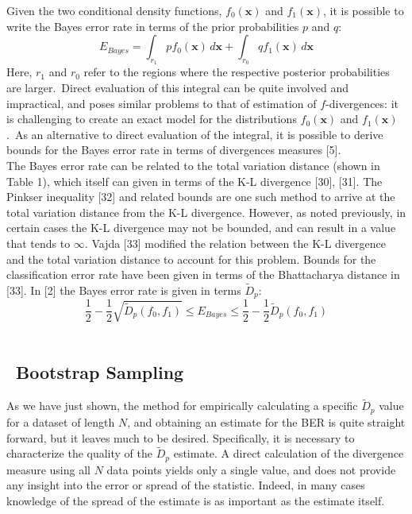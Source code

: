 \documentclass{article}
\begin{document}
	\indent Given the two conditional density functions, $f_0(\textbf{x})$ and $f_1(\textbf{x})$, it is possible to write the Bayes error rate in terms of the prior probabilities $p$ and $q$:
	\begin{equation} E_{Bayes}=\int_{r_1} pf_0(\textbf{x}) \,d\textbf{x} + \int_{r_0} qf_1(\textbf{x}) \,d\textbf{x} \end{equation}
	\indent Here, $r_1$ and $r_0$ refer to the regions where the respective posterior probabilities are larger.\ Direct evaluation of this integral can be quite involved and impractical, and poses similar problems to that of estimation of $f$-divergences: it is challenging to create an exact model for the distributions $f_0(\textbf{x})$ and $f_1(\textbf{x})$.\ As an alternative to direct evaluation of the integral, it is possible to derive bounds for the Bayes error rate in terms of divergences measures [5]. 
	\\ [0.5ex]	
	
	\indent The Bayes error rate can be related to the total variation distance (shown in Table 1), which itself can given in terms of the K-L divergence [30], [31]. The Pinkser inequality [32] and related bounds are one such method to arrive at the total variation distance from the K-L divergence. However, as noted previously, in certain cases the K-L divergence may not be bounded, and can result in a value that tends to $\infty$. Vajda [33] modified the relation between the K-L divergence and the total variation distance to account for this problem. Bounds for the classification error rate have been given in terms of the Bhattacharya distance in [33]. In [2] the Bayes error rate is given in terms $\widetilde{D}_p$:\begin{equation}
	\frac{1}{2}-\frac{1}{2}\sqrt{\widetilde{D}_p(f_0,f_1)}\leq E_{Bayes} \leq \frac{1}{2}-\frac{1}{2}\widetilde{D}_p(f_0,f_1)
	\end{equation}
	\\ [0.5ex]
	\subsection{\ Bootstrap Sampling}
	\indent	As we have just shown, the method for empirically calculating a specific $\widetilde{D}_p$ value for a dataset of length $N$, and obtaining an estimate for the BER is quite straight forward, but it leaves much to be desired. Specifically, it is necessary to characterize the quality of the $\widetilde{D}_p$ estimate. A direct calculation of the divergence measure using all $N$ data points yields only a single value, and does not provide any insight into the error or spread of  the statistic. Indeed, in many cases knowledge of the spread of the estimate is as important as the estimate itself.
	\\[0.5ex]
	
\end{document}
